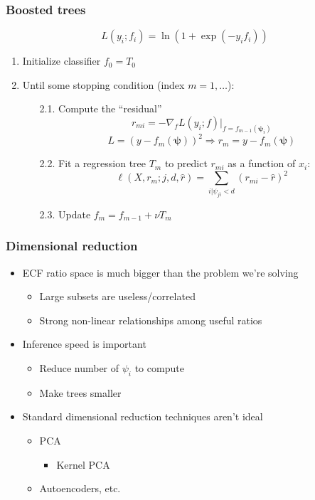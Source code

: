 \documentclass[aspectratio=169,xcolor=dvipsnames,,table,compress]{beamer}
\begin{document}
\begin{frame}[t] \frametitle{Boosted trees}
  \vspace{-5mm}
    \[L(y_i; f_i) = \ln\left(1 + \exp(-y_if_i)\right)\]
  \begin{enumerate}
    \item Initialize classifier $f_0 = T_0$
    \item Until some stopping condition (index $m=1,\dots$):
    \begin{enumerate}
      \item[2.1.] Compute the ``residual''
        \[r_{mi} = -\nabla_f L(y_i; f) |_{f=f_{m-1}(\bm\psi_i)}\]
        \[L = (y-f_m(\bm\psi))^2 \Rightarrow r_m = y - f_m(\bm\psi) \]
      \item[2.2.] Fit a regression tree $T_m$ to predict $r_{mi}$ as a function of $x_i$:
        \[\ell(X,r_m;j,d,\hat{r}) = \sum_{i | \psi_{ji} < d} (r_{mi} - \hat r)^2\]
      \item[2.3.] Update $f_m = f_{m-1} + \nu T_m$
    \end{enumerate}
  \end{enumerate}
\end{frame}

\begin{frame}[t] \frametitle{Dimensional reduction}
  \begin{itemize}
    \item ECF ratio space is much bigger than the problem we're solving
    \begin{itemize}
      \item Large subsets are useless/correlated
      \item Strong non-linear relationships among useful ratios
    \end{itemize}
    \item Inference speed is important
    \begin{itemize}
      \item Reduce number of $\psi_i$ to compute
      \item Make trees smaller
    \end{itemize}
    \item Standard dimensional reduction techniques aren't ideal
    \begin{itemize}
      \item PCA
      \begin{itemize}
        \item Kernel PCA
      \end{itemize}
      \item Autoencoders, etc.
    \end{itemize}
  \end{itemize}
\end{frame}
\end{document}
